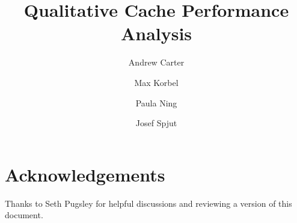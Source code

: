 \documentclass[pageno]{jpaper}
\begin{document}
\title{Qualitative Cache Performance Analysis}

\author{Andrew Carter \and Max Korbel \and Paula Ning \and Josef Spjut}
\date{}
\maketitle


\begin{abstract}

\end{abstract}









\section{Acknowledgements}
Thanks to Seth Pugsley for helpful discussions and reviewing a version of this document.



\end{document}
